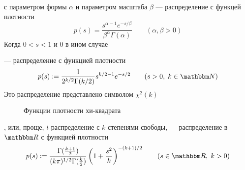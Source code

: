 \begin{frame}

    \vspace{2em}
    \Eg
     с параметром	формы $\alpha$ и параметром
    масштаба $\beta$ --- распределение с функцей плотности
    \begin{equation*}
        p(s) = 
        \frac{s^{\alpha-1} e^{-s/\beta}}{\beta^{\alpha} \Gamma(\alpha)} 
            \qquad (\alpha, \beta > 0)
    \end{equation*}
    Когда $0 < s < 1$ и $0$ в ином случае
    
\end{frame}


\begin{frame}

    \vspace{2em}
    \Eg
    --- распределение с функцией плотности
    \begin{equation*}
        p(s) := \frac{1}{2^{k/2} \Gamma(k/2)} s^{k/2 - 1} e^{-s/2} 
        \qquad (s > 0,\; k \in \NN)
    \end{equation*}
    Это распределение представлено символом $\chi^2(k)$
    
\end{frame}

\begin{frame}

    \begin{figure}
   \begin{center}
    \caption{\label{f:chisq_densities} Функции плотности хи-квадрата}
   \end{center}
    \end{figure}
    
\end{frame}

\begin{frame}

    \vspace{2em}
    \Eg
    , или, проще,
    $t$-распределение с $k$ степенями свободы, --- распределение в $\RR$ с
    функцией плотности
    \begin{equation*}
        p(s) := \frac{\Gamma(\frac{k+1}{2})}{(k\pi)^{1/2} \Gamma(\frac{k}{2})}
        \left( 1 + \frac{s^2}{k} \right)^{-(k+1)/2}
        \qquad (s \in \RR,\; k > 0)
    \end{equation*}
    
\end{frame}

